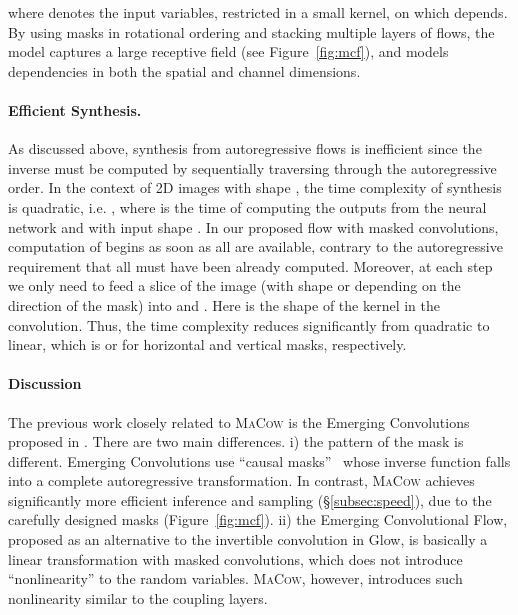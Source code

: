 \documentclass{article}
\begin{document}
where  denotes the input variables, restricted in a small kernel, on which  depends.
By using masks in rotational ordering and stacking multiple layers of flows, the model captures a large receptive field (see Figure~\ref{fig:mcf}), and models dependencies in both the spatial and channel dimensions.

\paragraph{Efficient Synthesis.} As discussed above, synthesis from autoregressive flows is inefficient since the inverse must be computed by sequentially traversing through the autoregressive order. 
In the context of 2D images with shape , the time complexity of synthesis is quadratic, i.e. , where  is the time of computing the outputs from the neural network  and  with input shape . 
In our proposed flow with masked convolutions, computation of  begins as soon as all  are available, contrary to the autoregressive requirement that all  must have been already computed.
Moreover, at each step we only need to feed a slice of the image (with shape  or  depending on the direction of the mask) into  and .
Here  is the shape of the kernel in the convolution.
Thus, the time complexity reduces significantly from quadratic to linear, which is  or  for horizontal and vertical masks, respectively.

\paragraph{Discussion}
The previous work closely related to \textsc{MaCow} is the Emerging Convolutions proposed in \citet{hoogeboom2019emerging}. 
There are two main differences.
i) the pattern of the mask is different. 
Emerging Convolutions use ``causal masks''~\citep{oord2016pixel} whose inverse function falls into a complete autoregressive transformation.
In contrast, \textsc{MaCow} achieves significantly more efficient inference and sampling (\S\ref{subsec:speed}), due to the carefully designed masks (Figure~\ref{fig:mcf}).
ii) the Emerging Convolutional Flow, proposed as an alternative to the invertible  convolution in Glow, is basically a linear transformation with masked convolutions, which does not introduce ``nonlinearity'' to the random variables.
\textsc{MaCow}, however, introduces such nonlinearity similar to the coupling layers. 
\end{document}
